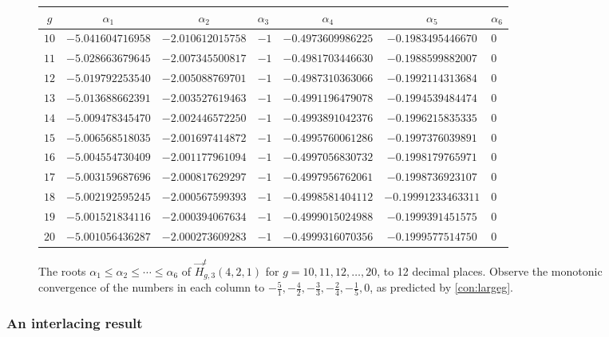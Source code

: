 \documentclass[a4paper]{article}
\theoremstyle{plain}
\numberwithin{theorem}{section}
\theoremstyle{definition}
\theoremstyle{remark}
\renewcommand{\leq}{\leqslant}
\newcommand{\HN}[3]{\vec{H}^t_{#1,#2}(#3)}
\begin{document}
\begin{figure} [ht!]
\begin{tabularx}{\textwidth}{cccYccY} \toprule
$g$ & $\alpha_1$ & $\alpha_2$ & $\alpha_3$ & $\alpha_4$ & $\alpha_5$ & $\alpha_6$ \\ \midrule
$10$ & $-5.041604716958$ & $-2.010612015758$ & $-1$ & $-0.4973609986225$ & $-0.1983495446670$ & $0$ \\
$11$ & $-5.028663679645$ & $-2.007345500817$ & $-1$ & $-0.4981703446630$ & $-0.1988599882007$ & $0$ \\
$12$ & $-5.019792253540$ & $-2.005088769701$ & $-1$ & $-0.4987310363066$ & $-0.1992114313684$ & $0$ \\
$13$ & $-5.013688662391$ & $-2.003527619463$ & $-1$ & $-0.4991196479078$ & $-0.1994539484474$ & $0$ \\
$14$ & $-5.009478345470$ & $-2.002446572250$ & $-1$ & $-0.4993891042376$ & $-0.1996215835335$ & $0$ \\
$15$ & $-5.006568518035$ & $-2.001697414872$ & $-1$ & $-0.4995760061286$ & $-0.1997376039891$ & $0$ \\
$16$ & $-5.004554730409$ & $-2.001177961094$ & $-1$ & $-0.4997056830732$ & $-0.1998179765971$ & $0$ \\
$17$ & $-5.003159687696$ & $-2.000817629297$ & $-1$ & $-0.4997956762061$ & $-0.1998736923107$ & $0$ \\
$18$ & $-5.002192595245$ & $-2.000567599393$ & $-1$ & $-0.4998581404112$ & $-0.19991233463311$ & $0$ \\
$19$ & $-5.001521834116$ & $-2.000394067634$ & $-1$ & $-0.4999015024988$ & $-0.1999391451575$ & $0$ \\
$20$ & $-5.001056436287$ & $-2.000273609283$ & $-1$ & $-0.4999316070356$ & $-0.1999577514750$ & $0$ \\ \bottomrule
\end{tabularx}
\caption{The roots $\alpha_1 \leq \alpha_2 \leq \cdots \leq \alpha_6$ of $\HN{g}{3}{4, 2, 1}$ for $g = 10, 11, 12, \ldots, 20$, to 12 decimal places. Observe the monotonic convergence of the numbers in each column to $-\frac{5}{1}, -\frac{4}{2}, -\frac{3}{3}, -\frac{2}{4}, -\frac{1}{5}, 0$, as predicted by \cref{con:largeg}.}
\label{table:gincreasing2}
\end{figure}



\subsubsection*{An interlacing result}
\end{document}
